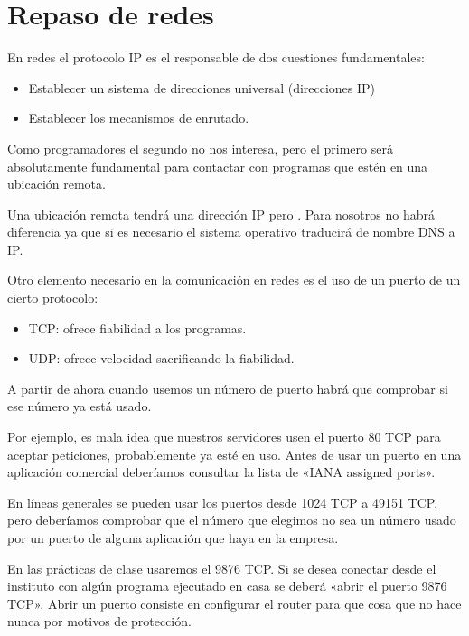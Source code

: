\documentclass[letterpaper,10pt,spanish]{sphinxmanual}
\begin{document}
\section{Repaso de redes}
\label{\detokenize{textos/tema3:repaso-de-redes}}
En redes el protocolo IP es el responsable de dos cuestiones fundamentales:
\begin{itemize}
\item {} 
Establecer un sistema de direcciones universal (direcciones IP)

\item {} 
Establecer los mecanismos de enrutado.

\end{itemize}

Como programadores el segundo no nos interesa, pero el primero será absolutamente fundamental para contactar con programas que estén en una ubicación remota.

Una ubicación remota  tendrá una dirección
IP pero . Para nosotros no habrá diferencia ya que si es necesario el sistema operativo traducirá de nombre DNS a IP.

Otro elemento necesario en la comunicación en redes es el uso de un puerto de un cierto protocolo:
\begin{itemize}
\item {} 
TCP: ofrece fiabilidad a los programas.

\item {} 
UDP: ofrece velocidad sacrificando la fiabilidad.

\end{itemize}

A partir de ahora cuando usemos un número de puerto habrá que comprobar si ese número ya está usado.

Por ejemplo, es mala idea que nuestros servidores usen el puerto 80 TCP para aceptar peticiones, probablemente ya esté en uso.
Antes de usar un puerto en una aplicación comercial deberíamos consultar la lista de «IANA assigned ports».

En líneas generales se pueden usar los puertos desde 1024 TCP a 49151 TCP, pero deberíamos comprobar que el número que elegimos no sea un número usado por un puerto de alguna aplicación que haya en la empresa.

En las prácticas de clase usaremos el 9876 TCP. Si se desea conectar desde el instituto con algún programa ejecutado en casa se deberá «abrir el puerto 9876 TCP». Abrir un puerto consiste en configurar el router para que  cosa que no hace nunca por motivos de protección.
\end{document}
